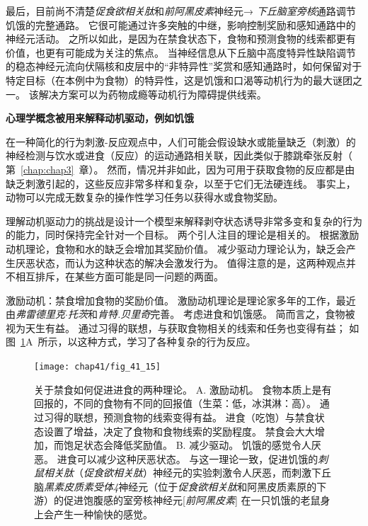 最后，目前尚不清楚\textit{促食欲相关肽}和\textit{前阿黑皮素}神经元→ \textit{下丘脑室旁核}通路调节饥饿的完整通路。
它很可能通过许多突触的中继，影响控制奖励和感知通路中的神经元活动。
之所以如此，是因为在禁食状态下，食物和预测食物的线索都更有价值，也更有可能成为关注的焦点。
当神经信息从下丘脑中高度特异性缺陷调节的稳态神经元流向伏隔核和皮层中的“非特异性”奖赏和感知通路时，如何保留对于特定目标（在本例中为食物）的特异性，这是饥饿和口渴等动机行为的最大谜团之一。
该解决方案可以为药物成瘾等动机行为障碍提供线索。


\textbf{心理学概念被用来解释动机驱动，例如饥饿}

在一种简化的行为刺激-反应观点中，人们可能会假设缺水或能量缺乏（刺激）的神经检测与饮水或进食（反应）的运动通路相关联，因此类似于膝跳牵张反射（ 第~\ref{chap:chap3}~章）。
然而，情况并非如此，因为可用于获取食物的反应都是由缺乏刺激引起的，这些反应非常多样和复杂，以至于它们无法硬连线。
事实上，动物可以完成无数复杂的操作性学习任务以获得水或食物奖励。


理解动机驱动力的挑战是设计一个模型来解释剥夺状态诱导非常多变和复杂的行为的能力，同时保持完全针对一个目标。 两个引人注目的理论是相关的。
根据激励动机理论，食物和水的缺乏会增加其奖励价值。
减少驱动力理论认为，缺乏会产生厌恶状态，而认为这种状态的解决会激发行为。
值得注意的是，这两种观点并不相互排斥，在某些方面可能是同一问题的两面。


激励动机：禁食增加食物的奖励价值。
激励动机理论是理论家多年的工作，最近由\textit{弗雷德里克$\cdot$托茨}和\textit{肯特.贝里奇}完善。
考虑进食和饥饿感。
简而言之，食物被视为天生有益。
通过习得的联想，与获取食物相关的线索和任务也变得有益；
如图~\ref{fig:41_15}A~所示，以这种方式，学习了各种复杂的行为反应。


\begin{figure}[htbp]
	\centering
	\texttt{[image: chap41/fig\_41\_15]}
	\caption{关于禁食如何促进进食的两种理论。 
		A. 激励动机。
		食物本质上是有回报的，不同的食物有不同的回报值（生菜：低，冰淇淋：高）。
		通过习得的联想，预测食物的线索变得有益。 进食（吃饱）与禁食状态设置了增益，决定了食物和食物线索的奖励程度。
		禁食会大大增加，而饱足状态会降低奖励值。
		B. 减少驱动。
		饥饿的感觉令人厌恶。
		进食可以减少这种厌恶状态。
		与这一理论一致，促进饥饿的\textit{刺鼠相关肽}（\textit{促食欲相关肽}）神经元的实验刺激令人厌恶，而刺激下丘脑\textit{黑素皮质素受体4}神经元（位于\textit{促食欲相关肽}和阿黑皮质素原的下游）的促进饱腹感的室旁核神经元[\textit{前阿黑皮素}] 在一只饥饿的老鼠身上会产生一种愉快的感觉。}
	\label{fig:41_15}
\end{figure}


